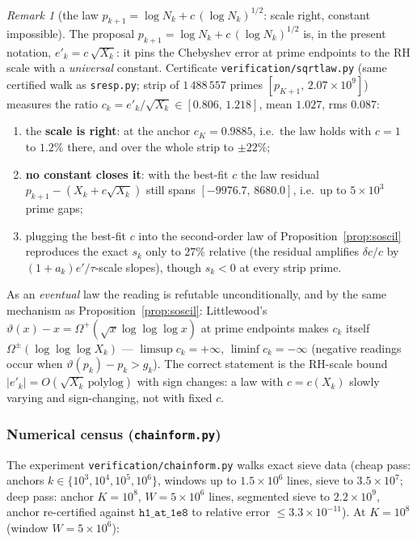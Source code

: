 \documentclass[11pt]{article}
\theoremstyle{remark}
\newtheorem{remark}[theorem]{Remark}
\begin{document}
\begin{remark}[the law $p_{k+1}=\log N_k+c\,(\log N_k)^{1/2}$: scale right, constant impossible]
\label{rem:sqrtlaw}
The proposal $p_{k+1}=\log N_k+c\,(\log N_k)^{1/2}$ is, in the present notation,
$e'_k=c\,\sqrt{X_k}$: it pins the Chebyshev error at prime endpoints to the RH
scale with a \emph{universal} constant. Certificate
\texttt{verification/sqrtlaw.py} (same certified walk as \texttt{sresp.py};
strip of $1\,488\,557$ primes $[p_{K+1},\,2.07\times10^9]$) measures the ratio
$c_k=e'_k/\sqrt{X_k}\in[0.806,\,1.218]$, mean $1.027$, rms $0.087$:
\begin{enumerate}
\item the \textbf{scale is right}: at the anchor $c_K=0.9885$, i.e.\ the law
holds with $c=1$ to $1.2\%$ there, and over the whole strip to $\pm22\%$;
\item \textbf{no constant closes it}: with the best-fit $c$ the law residual
$p_{k+1}-(X_k+c\sqrt{X_k})$ still spans $[-9976.7,\,8680.0]$, i.e.\ up to
$5\times10^3$ prime gaps;
\item plugging the best-fit $c$ into the second-order law of
Proposition~\ref{prop:soscil} reproduces the exact $s_k$ only to $27\%$
relative (the residual amplifies $\delta c/c$ by $(1+a_k)e'/\tau$-scale
slopes), though $s_k<0$ at every strip prime.
\end{enumerate}
As an \emph{eventual} law the reading is refutable unconditionally, and by the
same mechanism as Proposition~\ref{prop:soscil}: Littlewood's
$\vartheta(x)-x=\Omega^+(\sqrt x\log\log\log x)$ at prime endpoints makes
$c_k$ itself $\Omega^\pm(\log\log\log X_k)$ --- $\limsup c_k=+\infty$,
$\liminf c_k=-\infty$ (negative readings occur when
$\vartheta(p_k)-p_k>g_k$). The correct statement is the RH-scale bound
$|e'_k|=O(\sqrt{X_k}\,\mathrm{polylog})$ with sign changes: a law with
$c=c(X_k)$ slowly varying and sign-changing, not with fixed $c$.
\end{remark}

\subsubsection*{Numerical census (\texttt{chainform.py})}

The experiment \texttt{verification/chainform.py} walks exact sieve data
(cheap pass: anchors $k\in\{10^3,10^4,10^5,10^6\}$, windows up to
$1.5\times10^6$ lines, sieve to $3.5\times10^7$; deep pass: anchor
$K=10^8$, $W=5\times10^6$ lines, segmented sieve to $2.2\times10^9$, anchor
re-certified against $\texttt{h1\_at\_1e8}$ to relative error $\le3.3\times10^{-11}$).
At $K=10^8$ (window $W=5\times10^6$):
\end{document}
